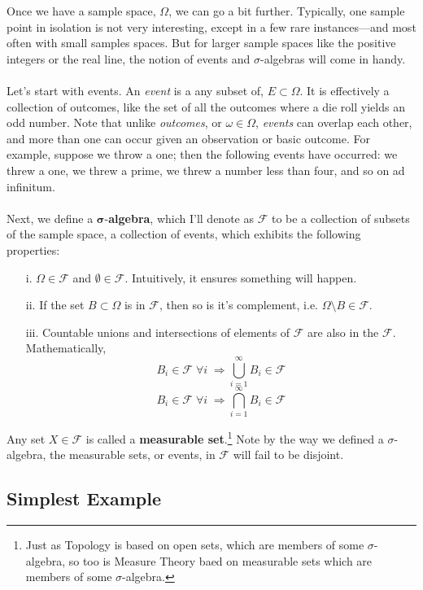 \documentclass[a4paper,12pt]{scrartcl}
\begin{document}
Once we have a sample space, $\Omega$, we can go a bit further.  
Typically, one sample point in isolation is not very interesting, except
in a few rare instances---and most often with small samples spaces.  But 
for larger sample spaces like the positive integers or the real line, 
the notion of events and $\sigma$-algebras will come in handy.  
\\
\\
Let's start with events. An \emph{event} is a any subset of, $E \subset
\Omega$. It is effectively a collection of outcomes, like the set of
all the outcomes where a die roll yields an odd number. 
Note that unlike \emph{outcomes}, or $\omega \in \Omega$, \emph{events}
can overlap each other, and more than one can occur given an observation
or basic outcome.  For example, suppose we throw a one; then the
following events have occurred: we threw a one, we threw a prime, we
threw a number less than four, and so on ad infinitum.
\\
\\
Next, we define a $\mathbf{\sigma}$-\textbf{algebra}, 
which I'll denote as 
$\mathcal{F}$ to be a collection of subsets of the sample space, a 
collection of events, which 
exhibits the following properties:
\begin{itemize}
   \item[i.] $\Omega \in \mathcal{F}$ and $\emptyset \in \mathcal{F}$.
      Intuitively, it ensures something will happen.
   \item[ii.] If the set $B \subset \Omega$ is in $\mathcal{F}$, 
      then so is it's complement, i.e. $\Omega \setminus B \in 
      \mathcal{F}$.
   \item[iii.] Countable unions and intersections of elements of 
      $\mathcal{F}$ are also in the $\mathcal{F}$.  Mathematically,
      \[ B_i \in \mathcal{F} \; \forall i \; \Rightarrow 
	 \bigcup_{i=1}^{\infty} B_i \in \mathcal{F} \]
      \[ B_i \in \mathcal{F} \; \forall i \; \Rightarrow 
	 \bigcap_{i=1}^{\infty} B_i \in \mathcal{F} \]
\end{itemize}
Any set $X \in \mathcal{F}$ is called a 
\textbf{measurable set}.\footnote{Just as Topology is based on open
sets, which are members of some $\sigma$-algebra, so too is Measure
Theory baed on measurable sets which are members of some 
$\sigma$-algebra.} Note by the way we defined a $\sigma$-algebra, 
the measurable sets, or events, in $\mathcal{F}$ will fail to be 
disjoint.



\subsection{Simplest Example}
\end{document}
